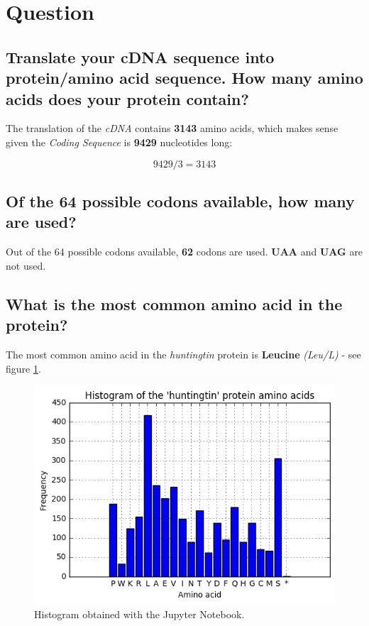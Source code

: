 \section{Question}

\subsection{Translate your cDNA sequence into protein/amino acid sequence. How many amino acids does your protein contain?  }

The translation of the \textit{cDNA} contains \textbf{3143} amino acids, which makes sense given the \textit{Coding Sequence} is \textbf{9429} nucleotides long:

\[
    9429 / 3 = 3143
\]

\medskip


\subsection{Of the 64 possible codons available, how many are used?}

Out of the 64 possible codons available, \textbf{62} codons are used. \textbf{UAA} and \textbf{UAG} are not used.

\medskip


\subsection{What is the most common amino acid in the protein?}

The most common amino acid in the \textit{huntingtin} protein is \textbf{Leucine} \textit{(Leu/L)} - see figure \ref{fig:amino-acids-hist}.

\begin{figure}[ht]
    \centering
    \includegraphics[width=0.8\linewidth]{res/amino-acids-hist.png}
    \caption{Histogram obtained with the Jupyter Notebook.}
    \label{fig:amino-acids-hist}
\end{figure}

